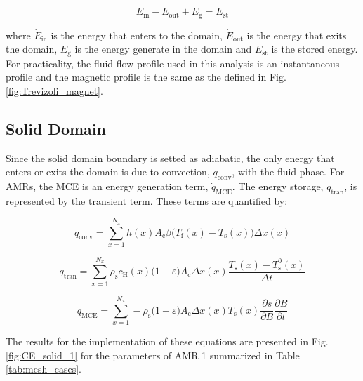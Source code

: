 \documentclass[review,preprint,12pt]{elsarticle}
\begin{document}
\begin{equation}
\label{En_bal_general}
\dot{E}_\textrm{in} - \dot{E}_\textrm{out} + \dot{E}_\textrm{g} = \dot{E}_\textrm{st}
\end{equation}

\noindent where $\dot{E}_\textrm{in}$ is the energy that enters to the domain, $\dot{E}_\textrm{out}$ is the energy that exits the domain, $\dot{E}_\textrm{g}$ is the energy generate in the domain and $\dot{E}_\textrm{st}$ is the stored energy. For practicality, the fluid flow profile used in this analysis is an instantaneous profile and the magnetic profile is the same as the defined in Fig. \ref{fig:Trevizoli_magnet}.

\subsection{Solid Domain}
Since the solid domain boundary is setted as adiabatic, the only energy that enters or exits the domain is due to convection, $q_\textrm{conv}$, with the fluid phase. For AMRs, the MCE is an energy generation term, $\dot{q}_\textrm{MCE}$. The energy storage, $q_\textrm{tran}$, is represented by the transient term. These terms are quantified by:

\begin{equation}
\label{EC_s_conv}
q_\textrm{conv} =\sum_{x=1}^{N_x} h(x)A_\textrm{c}\beta \big(T_\textrm{f}(x) - T_\textrm{s}(x)\bigg) \Delta x(x)
\end{equation}

\begin{equation}
\label{EC_s_trans}
q_\textrm{tran} = \sum_{x=1}^{N_x} \rho_\textrm{s}c_\textrm{H}(x)\big(1-\varepsilon\big)A_\textrm{c} \Delta x(x) \frac{T_\textrm{s}(x) - T_\textrm{s}^0(x)}{\Delta t}
\end{equation}

\begin{equation}
\label{EC_s_mce}
\dot{q}_\textrm{MCE} = \sum_{x=1}^{N_x} -\rho_\textrm{s}\big(1-\varepsilon\big)A_\textrm{c} \Delta x(x) T_\textrm{s}(x)\frac{\partial s}{\partial B}\frac{\partial B}{\partial t}
\end{equation}

The results for the implementation of these equations are presented in Fig. \ref{fig:CE_solid_1} for the parameters of AMR 1 summarized in Table \ref{tab:mesh_cases}.
\end{document}
